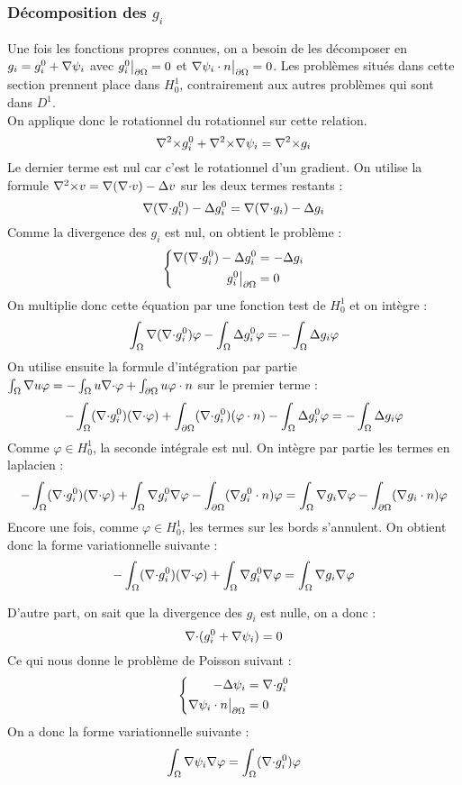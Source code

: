 \subsubsection{Décomposition des $g_i$}
\label{decomp}

Une fois les fonctions propres connues, on a besoin de les décomposer en $g_i=g_i^0+{\nabla}\psi_i$ avec $g_i^0{\big\rvert_{\partial\Omega}} = 0$ et ${\nabla}\psi_i\cdot n{\big\rvert_{\partial\Omega}} = 0$. Les problèmes situés dans cette section prennent place dans $H^1_0$, contrairement aux autres problèmes qui sont dans $D^1$.\\
On applique donc le rotationnel du rotationnel sur cette relation.\\
\[
{\nabla^2\times} g_i^0 +{\nabla^2\times}{\nabla}\psi_i = {\nabla^2\times} g_i
\]
Le dernier terme est nul car c'est le rotationnel d'un gradient. On utilise la formule ${\nabla^2\times} v={\nabla}({\nabla\cdot} v)-{\Delta} v$ sur les deux termes restants :
\[
{\nabla}({\nabla\cdot} g_i^0)-{\Delta} g_i^0 = {\nabla}({\nabla\cdot} g_i)-{\Delta} g_i
\]
Comme la divergence des $g_i$ est nul, on obtient le problème :
\[
\left\{
\begin{aligned}
{\nabla}({\nabla\cdot} g_i^0)-{\Delta} g_i^0 &= -{\Delta} g_i\\
g_i^0{\big\rvert_{\partial\Omega}} &= 0
\end{aligned}
\right.
\]
On multiplie donc cette équation par une fonction test de $H^1_0$ et on intègre :
\[
\int_\Omega {\nabla}({\nabla\cdot} g_i^0)\varphi - \int_\Omega {\Delta} g_i^0\varphi = -\int_\Omega {\Delta} g_i\varphi
\]
On utilise ensuite la formule d'intégration par partie $\int_\Omega {\nabla} u\varphi = -\int_\Omega u{\nabla\cdot}\varphi + \int_{\partial\Omega} u\varphi\cdot n$ sur le premier terme : 
\[
-\int_\Omega ({\nabla\cdot} g_i^0)({\nabla\cdot}\varphi) + \int_{\partial\Omega} ({\nabla\cdot} g_i^0)(\varphi\cdot n) - \int_\Omega {\Delta} g_i^0\varphi = -\int_\Omega {\Delta} g_i\varphi
\]
Comme $\varphi\in H^1_0$, la seconde intégrale est nul. On intègre par partie les termes en laplacien :
\[
-\int_\Omega ({\nabla\cdot} g_i^0)({\nabla\cdot}\varphi) + \int_\Omega {\nabla} g_i^0{\nabla}\varphi - \int_{\partial\Omega} ({\nabla} g_i^0\cdot n)\varphi = \int_\Omega {\nabla} g_i{\nabla}\varphi - \int_{\partial\Omega} ({\nabla} g_i\cdot n)\varphi
\]
Encore une fois, comme $\varphi\in H^1_0$, les termes sur les bords s'annulent. On obtient donc la forme variationnelle suivante :
\begin{eqnarray}
\label{fvgi0}
-\int_\Omega ({\nabla\cdot} g_i^0)({\nabla\cdot}\varphi) + \int_\Omega {\nabla} g_i^0{\nabla}\varphi = \int_\Omega {\nabla} g_i{\nabla}\varphi
\end{eqnarray}

D'autre part, on sait que la divergence des $g_i$ est nulle, on a donc :
\[
{\nabla\cdot} (g_i^0+{\nabla}\psi_i)=0
\]
Ce qui nous donne le problème de Poisson suivant :
\[
\left\{
\begin{aligned}
-{\Delta}\psi_i &= {\nabla\cdot} g_i^0\\
{\nabla}\psi_i\cdot n{\big\rvert_{\partial\Omega}} &= 0
\end{aligned}
\right.
\]
On a donc la forme variationnelle suivante :
\begin{eqnarray}
\label{fvpsii}
\int_\Omega {\nabla}\psi_i{\nabla}\varphi = \int_\Omega ({\nabla\cdot} g_i^0)\varphi
\end{eqnarray}

